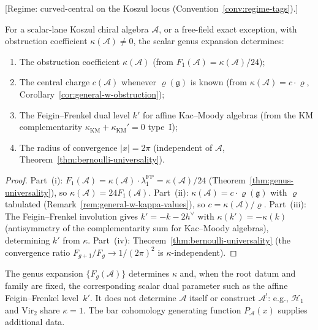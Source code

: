 \begin{theorem}
\label{thm:genus-determines-pair}
\textup{[Regime: curved-central on the Koszul locus
\textup{(}Convention~\textup{\ref{conv:regime-tags})}.]}

For a scalar-lane Koszul chiral algebra $\mathcal{A}$, or a
free-field exact exception, with obstruction coefficient
$\kappa(\mathcal{A}) \neq 0$, the scalar genus expansion determines:
\begin{enumerate}[label=\textup{(\roman*)}]
\item The obstruction coefficient $\kappa(\mathcal{A})$
\textup{(}from $F_1(\mathcal{A})=\kappa(\mathcal{A})/24$\textup{)};
\item The central charge $c(\mathcal{A})$ whenever $\varrho(\mathfrak{g})$ is
known \textup{(}from $\kappa(\mathcal{A}) = c \cdot \varrho$,
Corollary~\textup{\ref{cor:general-w-obstruction})};
\item The Feigin--Frenkel dual level $k'$ for affine Kac--Moody algebras
\textup{(}from the KM complementarity $\kappa_{\mathrm{KM}} + \kappa_{\mathrm{KM}}' = 0$ type~I\textup{)};
\item The radius of convergence $|x| = 2\pi$
\textup{(}independent of $\mathcal{A}$,
Theorem~\textup{\ref{thm:bernoulli-universality})}.
\end{enumerate}
\end{theorem}

\begin{proof}
Part~(i): $F_1(\mathcal{A})
= \kappa(\mathcal{A}) \cdot \lambda_1^{\mathrm{FP}}
= \kappa(\mathcal{A})/24$
(Theorem~\ref{thm:genus-universality}), so $\kappa(\mathcal{A}) = 24 F_1(\mathcal{A})$.
Part~(ii): $\kappa(\mathcal{A}) = c \cdot \varrho(\mathfrak{g})$ with $\varrho$ tabulated
(Remark~\ref{rem:general-w-kappa-values}), so $c = \kappa(\mathcal{A})/\varrho$.
Part~(iii): The Feigin--Frenkel involution gives $k' = -k - 2h^\vee$ with
$\kappa(k') = -\kappa(k)$ (antisymmetry of the complementarity sum for
Kac--Moody algebras), determining $k'$ from $\kappa$.
Part~(iv): Theorem~\ref{thm:bernoulli-universality} (the convergence
ratio $F_{g+1}/F_g \to 1/(2\pi)^2$ is $\kappa$-independent).
\end{proof}

\begin{remark}

\label{rem:genus-complete-invariant}
The genus expansion $\{F_g(\mathcal{A})\}$ determines $\kappa$ and,
when the root datum and family are fixed, the corresponding scalar
dual parameter such as the affine Feigin--Frenkel level~$k'$. It does
not determine $\mathcal{A}$ itself or construct $\mathcal{A}^!$:
e.g., $\mathcal{H}_1$ and $\mathrm{Vir}_2$ share $\kappa = 1$. The
bar cohomology generating function $P_{\mathcal{A}}(x)$ supplies
additional data.
\end{remark}

